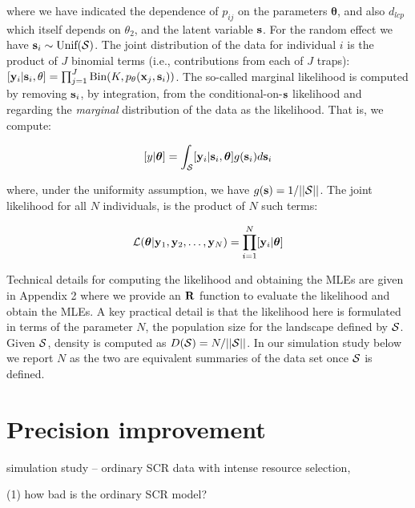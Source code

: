{\flushleft where} we have indicated the dependence of $p_{ij}$ on the parameters
${\bm \theta}$, and also $d_{lcp}$ which
itself depends on $\theta_{2}$, and the latent variable ${\bf s}$.
For the random effect we have ${\bf s}_{i} \sim  \mbox{Unif}({\cal
  S})$.
The joint distribution of the data for individual $i$ is the product
of $J$ binomial terms (i.e., contributions from each of $J$ traps):
$  [{\bf y}_{i} | {\bf s}_{i} , \theta] =
  \prod_{j=1}^{J} \mbox{Bin}(K, p_{\theta}({\bf x}_{j},{\bf s}_{i}) )$.
 The so-called marginal likelihood is computed by removing
${\bf s}_{i}$, by integration,  from the conditional-on-${\bf s}$
likelihood and regarding the {\it marginal} distribution of the data
as the likelihood. That
is, we compute:

\[
  [y|{\bm \theta}] =
\int_{{\cal S}}  [ {\bf y}_{i} |{\bf s}_{i},{\bm \theta}] g({\bf s}_{i}) d{\bf s}_{i}
\]

{\flushleft where}, under the uniformity assumption, we have
$g({\bf s}) = 1/||{\cal S}||$.
The joint likelihood for all $N$ individuals, 
is the product of $N$ such terms:

\[
{\cal L}({\bm \theta} | {\bf y}_{1},{\bf y}_{2},\ldots, {\bf y}_{N}) = \prod_{i=1}^{N}
[{\bf y}_{i}|{\bm \theta}]
\]

Technical details for computing the likelihood and obtaining the MLEs
are given in Appendix 2 where we provide an ${\bf R}$ function
to evaluate the likelihood and obtain the MLEs.
A key practical detail is that the likelihood here is formulated in
terms of the parameter $N$, the population size for the landscape
defined by ${\cal S}$. Given ${\cal S}$, density
is
computed as $D({\cal S}) = N/||{\cal S}||$. In our simulation study
below we report $N$ as the two are equivalent summaries of the data
set once ${\cal S}$ is defined.

\section{Precision improvement}

simulation study -- ordinary SCR data with intense resource selection,

(1) how bad is the ordinary SCR model?

